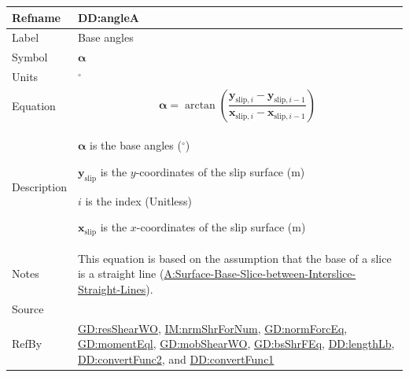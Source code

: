 \documentclass[12pt]{article}
\begin{document}
\medskip
\noindent
\begin{minipage}{\textwidth}
\begin{tabular}{>{\raggedright}p{}>{\raggedright\arraybackslash}p{}}
\toprule \textbf{Refname} & \textbf{DD:angleA}
\label{DD:angleA}
\\ \midrule
Label & Base angles
        
\\ \midrule
Symbol & $\symbf{α}$
         
\\ \midrule
Units & ${{}^{\circ}}$
        
\\ \midrule
Equation & \begin{displaymath}
           \symbf{α}=\arctan\left(\frac{{\symbf{y}_{\text{slip},i}}-{\symbf{y}_{\text{slip},i-1}}}{{\symbf{x}_{\text{slip},i}}-{\symbf{x}_{\text{slip},i-1}}}\right)
           \end{displaymath}
\\ \midrule
Description & \begin{symbDescription}
              \item{$\symbf{α}$ is the base angles (${{}^{\circ}}$)}
              \item{${\symbf{y}_{\text{slip}}}$ is the $y$-coordinates of the slip surface (${\text{m}}$)}
              \item{$i$ is the index (Unitless)}
              \item{${\symbf{x}_{\text{slip}}}$ is the $x$-coordinates of the slip surface (${\text{m}}$)}
              \end{symbDescription}
\\ \midrule
Notes & This equation is based on the assumption that the base of a slice is a straight line (\hyperref[assumpSBSBISL]{A:Surface-Base-Slice-between-Interslice-Straight-Lines}).
        
\\ \midrule
Source & \cite{fredlund1977}
         
\\ \midrule
RefBy & \hyperref[GD:resShearWO]{GD:resShearWO}, \hyperref[IM:nrmShrForNum]{IM:nrmShrForNum}, \hyperref[GD:normForcEq]{GD:normForcEq}, \hyperref[GD:momentEql]{GD:momentEql}, \hyperref[GD:mobShearWO]{GD:mobShearWO}, \hyperref[GD:bsShrFEq]{GD:bsShrFEq}, \hyperref[DD:lengthLb]{DD:lengthLb}, \hyperref[DD:convertFunc2]{DD:convertFunc2}, and \hyperref[DD:convertFunc1]{DD:convertFunc1}
        
\\ \bottomrule
\end{tabular}
\end{minipage}
\end{document}
